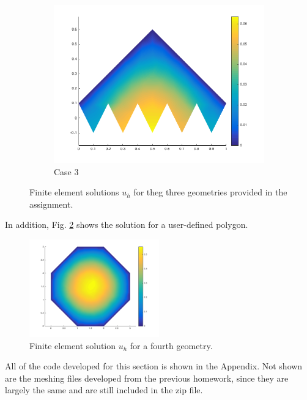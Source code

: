 \documentclass[10pt]{article}
\begin{document}
\begin{figure}[H]
\begin{subfigure}[b]{0.35\textwidth}
                \includegraphics[width=\textwidth]{case3.png}
                \caption{Case 3}
        \end{subfigure}%
        \caption{Finite element solutions \(u_h\) for theg three geometries provided in the assignment.}
        \label{fig:5}
\end{figure}

In addition, Fig. \ref{fig:10} shows the solution for a user-defined polygon. 

\begin{figure}[H]
\centering
\includegraphics[width=0.5\textwidth]{case4.png}
\caption{Finite element solution \(u_h\) for a fourth geometry.}
\label{fig:10}
\end{figure}

All of the code developed for this section is shown in the Appendix. Not shown are the meshing files developed from the previous homework, since they are largely the same and are still included in the zip file.

\section{}
\end{document}
